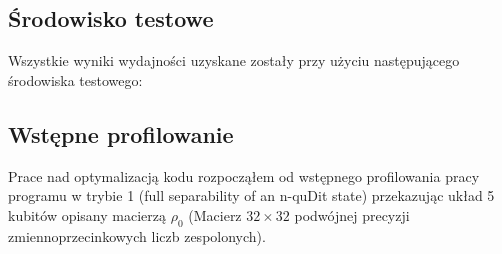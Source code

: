 \documentclass[10pt, a4paper]{article}
\begin{document}
\begin{sloppypar}
    \subsection{Środowisko testowe}


    Wszystkie wyniki wydajności uzyskane zostały przy użyciu następującego środowiska testowego:

    \FloatBarrier
    \begin{table}[ht]
      \centering
      
    \end{table}
    \FloatBarrier

    \subsection{Wstępne profilowanie}


    Prace nad optymalizacją kodu rozpocząłem od wstępnego profilowania pracy programu w
    trybie 1 (full separability of an n-quDit state) przekazując układ 5 kubitów opisany
    macierzą $\rho_{0}$ (Macierz $32\times 32$ podwójnej precyzji zmiennoprzecinkowych liczb
    zespolonych).


\end{sloppypar}
\end{document}
